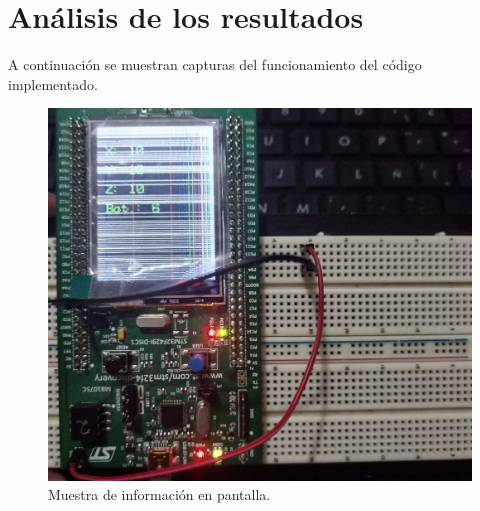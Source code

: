 \section{Análisis de los resultados}
A continuación se muestran capturas del funcionamiento del código implementado.

\begin{figure}[H]
    \centering
    \includegraphics[scale=.3]{Imagenes/codig4.png}
    \caption{Muestra de información en pantalla.}
    \label{codig4}
\end{figure}

